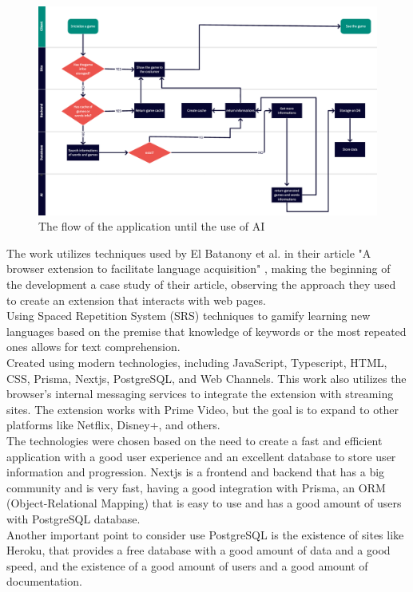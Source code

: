 \documentclass[12pt]{article}
\begin{document}
\begin{figure}[!h]
  \centering
  \caption{
    The flow of the application until the use of AI
  }
  \label{fig:flow_diagram}
  \includegraphics[width=1\textwidth]{assets/26.png}
\end{figure}
The work utilizes techniques used by El Batanony et al. in their article "A browser extension to facilitate language acquisition" \cite{ElBatanony21}, making the beginning of the development a case study of their article, observing the approach they used to create an extension that interacts with web pages.  \\
Using Spaced Repetition System (SRS) techniques to gamify learning new languages based on the premise that knowledge of keywords or the most repeated ones allows for text comprehension. \\
Created using modern technologies, including JavaScript, Typescript, HTML, CSS, Prisma, Nextjs, PostgreSQL, and Web Channels. This work also utilizes the browser's internal messaging services to integrate the extension with streaming sites. The extension works with Prime Video, but the goal is to expand to other platforms like Netflix, Disney+, and others. \\
The technologies were chosen based on the need to create a fast and efficient application with a good user experience and an excellent database to store user information and progression. Nextjs is a frontend and backend that has a big community and is very fast, having a good integration with Prisma, an ORM (Object-Relational Mapping) that is easy to use and has a good amount of users with PostgreSQL database. \\
Another important point to consider use PostgreSQL is the existence of sites like Heroku, that provides a free database with a good amount of data and a good speed, and the existence of a good amount of users and a good amount of documentation. \\
\end{document}
